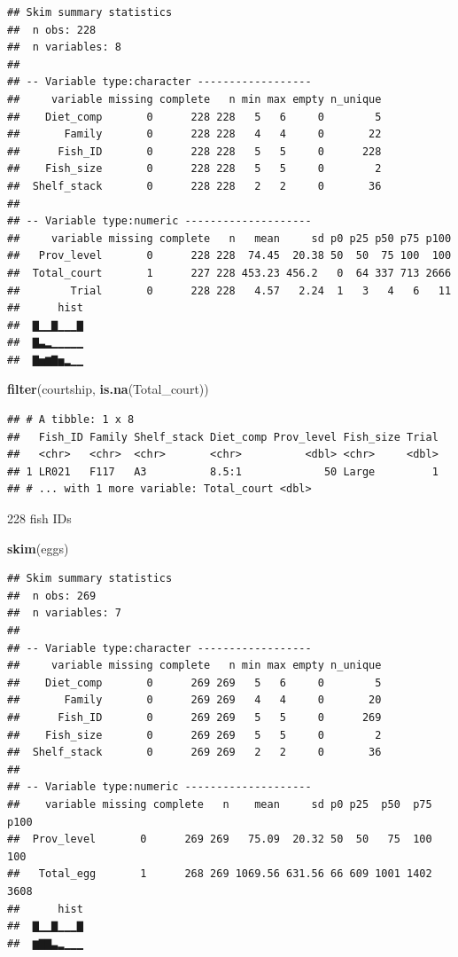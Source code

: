 \documentclass[]{book}
\newenvironment{Shaded}{\begin{snugshade}}{\end{snugshade}}
\newcommand{\KeywordTok}[1]{\textcolor[rgb]{0.13,0.29,0.53}{\textbf{#1}}}
\newcommand{\NormalTok}[1]{#1}
\begin{document}
\begin{verbatim}
## Skim summary statistics
##  n obs: 228 
##  n variables: 8 
## 
## -- Variable type:character ------------------
##     variable missing complete   n min max empty n_unique
##    Diet_comp       0      228 228   5   6     0        5
##       Family       0      228 228   4   4     0       22
##      Fish_ID       0      228 228   5   5     0      228
##    Fish_size       0      228 228   5   5     0        2
##  Shelf_stack       0      228 228   2   2     0       36
## 
## -- Variable type:numeric --------------------
##     variable missing complete   n   mean     sd p0 p25 p50 p75 p100
##   Prov_level       0      228 228  74.45  20.38 50  50  75 100  100
##  Total_court       1      227 228 453.23 456.2   0  64 337 713 2666
##        Trial       0      228 228   4.57   2.24  1   3   4   6   11
##      hist
##  ▇▁▁▇▁▁▁▇
##  ▇▃▂▁▁▁▁▁
##  ▇▅▆▇▅▂▁▁
\end{verbatim}

\begin{Shaded}
\begin{Highlighting}[]
\KeywordTok{filter}\NormalTok{(courtship, }\KeywordTok{is.na}\NormalTok{(Total_court))}
\end{Highlighting}
\end{Shaded}

\begin{verbatim}
## # A tibble: 1 x 8
##   Fish_ID Family Shelf_stack Diet_comp Prov_level Fish_size Trial
##   <chr>   <chr>  <chr>       <chr>          <dbl> <chr>     <dbl>
## 1 LR021   F117   A3          8.5:1             50 Large         1
## # ... with 1 more variable: Total_court <dbl>
\end{verbatim}

228 fish IDs

\begin{Shaded}
\begin{Highlighting}[]
\KeywordTok{skim}\NormalTok{(eggs)}
\end{Highlighting}
\end{Shaded}

\begin{verbatim}
## Skim summary statistics
##  n obs: 269 
##  n variables: 7 
## 
## -- Variable type:character ------------------
##     variable missing complete   n min max empty n_unique
##    Diet_comp       0      269 269   5   6     0        5
##       Family       0      269 269   4   4     0       20
##      Fish_ID       0      269 269   5   5     0      269
##    Fish_size       0      269 269   5   5     0        2
##  Shelf_stack       0      269 269   2   2     0       36
## 
## -- Variable type:numeric --------------------
##    variable missing complete   n    mean     sd p0 p25  p50  p75 p100
##  Prov_level       0      269 269   75.09  20.32 50  50   75  100  100
##   Total_egg       1      268 269 1069.56 631.56 66 609 1001 1402 3608
##      hist
##  ▇▁▁▇▁▁▁▇
##  ▆▇▇▃▂▁▁▁
\end{verbatim}
\end{document}
